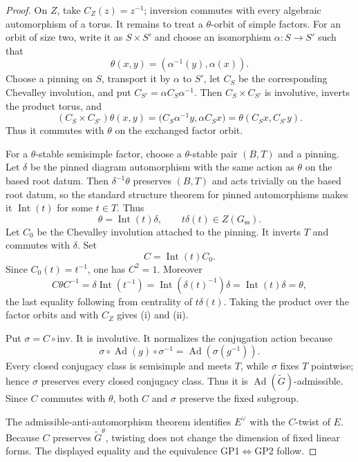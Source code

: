\documentclass[11pt,reqno]{amsart}
\numberwithin{equation}{section}
\theoremstyle{definition}
\theoremstyle{remark}
\newcommand{\Ad}{\operatorname{Ad}}
\begin{document}
\begin{proof}
On $Z$, take $C_Z(z)=z^{-1}$; inversion commutes with every algebraic
automorphism of a torus.  It remains to treat a $\theta$-orbit of simple factors.
For an orbit of size two, write it as $S\times S'$ and choose an isomorphism
$\alpha:S\to S'$ such that
\[
 \theta(x,y)=(\alpha^{-1}(y),\alpha(x)).
\]
Choose a pinning on $S$, transport it by $\alpha$ to $S'$, let $C_S$ be the
corresponding Chevalley involution, and put
$C_{S'}=\alpha C_S\alpha^{-1}$.  Then $C_S\times C_{S'}$ is involutive,
inverts the product torus, and
\[
 (C_S\times C_{S'})\theta(x,y)
 =\bigl(C_S\alpha^{-1}y,\alpha C_Sx\bigr)
 =\theta(C_Sx,C_{S'}y).
\]
Thus it commutes with $\theta$ on the exchanged factor orbit.

For a $\theta$-stable semisimple factor, choose a $\theta$-stable pair
$(B,T)$ and a pinning.  Let $\delta$ be the pinned diagram automorphism with
the same action as $\theta$ on the based root datum.  Then
$\delta^{-1}\theta$ preserves $(B,T)$ and acts trivially on the based root
datum, so the standard structure theorem for pinned automorphisms
\cite{Steinberg} makes it $\operatorname{Int}(t)$ for some $t\in T$.  Thus
\[
 \theta=\operatorname{Int}(t)\delta,
 \qquad t\delta(t)\in Z(G_{\mathrm{ss}}).
\]
Let $C_0$ be the Chevalley involution attached to the pinning.  It inverts $T$
and commutes with $\delta$.  Set
\[
 C=\operatorname{Int}(t)C_0.
\]
Since $C_0(t)=t^{-1}$, one has $C^2=1$.  Moreover
\[
 C\theta C^{-1}
 =\delta\operatorname{Int}(t^{-1})
 =\operatorname{Int}(\delta(t)^{-1})\delta
 =\operatorname{Int}(t)\delta=\theta,
\]
the last equality following from centrality of $t\delta(t)$.  Taking the product
over the factor orbits and with $C_Z$ gives (i) and (ii).

Put $\sigma=C\circ\mathrm{inv}$.  It is involutive.  It normalizes the
conjugation action because
\[
 \sigma\circ\Ad(g)\circ\sigma^{-1}=\Ad(\sigma(g^{-1})).
\]
Every closed conjugacy class is semisimple and meets $T$, while $\sigma$ fixes
$T$ pointwise; hence $\sigma$ preserves every closed conjugacy class.  Thus it
is $\Ad(\widetilde G)$-admissible.  Since $C$ commutes with $\theta$, both $C$
and $\sigma$ preserve the fixed subgroup.

The admissible-anti-automorphism theorem
\cite[Theorem~8.2.1 and Corollary~8.2.3]{AG09} identifies $E^\vee$ with the
$C$-twist of $E$.  Because $C$ preserves $\widetilde G^\theta$, twisting does
not change the dimension of fixed linear forms.  The displayed equality and
the equivalence GP1$\Leftrightarrow$GP2 follow.
\end{proof}
\end{document}
